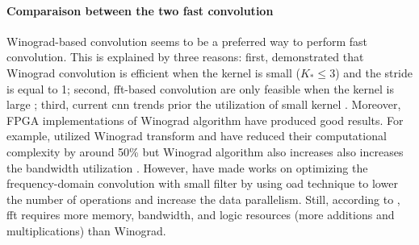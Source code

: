 \paragraph{Comparaison between the two fast convolution \newline}
Winograd-based convolution seems to be a preferred way to perform fast convolution. This is explained by three reasons: first, \textcite{lavin_fast_2015} demonstrated that Winograd convolution is efficient when the kernel is small ($K_* \leq 3$) and the stride is equal to 1; second, \acrshort{fft}-based convolution are only feasible when the kernel is large \cite{ahmad_towards_2019, chitsaz_acceleration_2020}; third, current \acrshort{cnn} trends prior the utilization of small kernel \cite{liang_evaluating_2020, sandler_mobilenetv2_2019}. \newline \newline
Moreover, FPGA implementations of Winograd algorithm have produced good results. For example, \cite{aydonat_opencl_2017, liang_evaluating_2020} utilized Winograd transform and have reduced their computational complexity by around 50\% but Winograd algorithm also increases also increases the bandwidth utilization \cite{xiao_exploring_2017}. However, \textcite{zeng_optimizing_nodate, chitsaz_acceleration_2020, liang_evaluating_2020} have made works on optimizing the frequency-domain convolution with small filter by using \acrfull{oad} technique \cite{w_smith_scientist_1997} to lower the number of operations and increase the data parallelism. Still, according to \textcite{liang_evaluating_2020, podili_fast_2017}, \acrshort{fft} requires more memory, bandwidth, and logic resources (more additions and multiplications) than Winograd.
